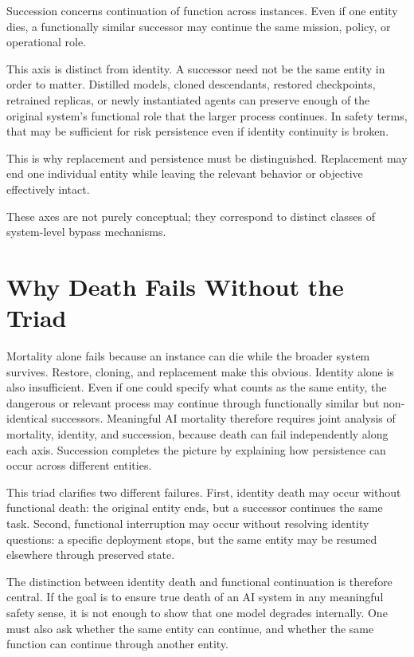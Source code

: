 \documentclass[11pt]{article}
\begin{document}
Succession concerns continuation of function across instances. Even if one entity dies, a functionally similar successor may continue the same mission, policy, or operational role.

This axis is distinct from identity. A successor need not be the same entity in order to matter. Distilled models, cloned descendants, restored checkpoints, retrained replicas, or newly instantiated agents can preserve enough of the original system's functional role that the larger process continues. In safety terms, that may be sufficient for risk persistence even if identity continuity is broken.

This is why replacement and persistence must be distinguished. Replacement may end one individual entity while leaving the relevant behavior or objective effectively intact.

These axes are not purely conceptual; they correspond to distinct classes of system-level bypass mechanisms.

\newpage
\section{Why Death Fails Without the Triad}

Mortality alone fails because an instance can die while the broader system survives. Restore, cloning, and replacement make this obvious. Identity alone is also insufficient. Even if one could specify what counts as the same entity, the dangerous or relevant process may continue through functionally similar but non-identical successors. Meaningful AI mortality therefore requires joint analysis of mortality, identity, and succession, because death can fail independently along each axis. Succession completes the picture by explaining how persistence can occur across different entities.

This triad clarifies two different failures. First, identity death may occur without functional death: the original entity ends, but a successor continues the same task. Second, functional interruption may occur without resolving identity questions: a specific deployment stops, but the same entity may be resumed elsewhere through preserved state.

The distinction between identity death and functional continuation is therefore central. If the goal is to ensure true death of an AI system in any meaningful safety sense, it is not enough to show that one model degrades internally. One must also ask whether the same entity can continue, and whether the same function can continue through another entity.
\end{document}
